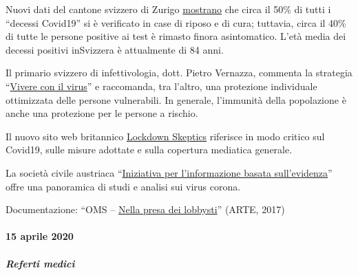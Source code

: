 Nuovi dati del cantone svizzero di Zurigo
\href{https://www.srf.ch/news/regional/zuerich-schaffhausen/corona-uebersicht-zh-und-sh-schlieren-als-zentrum-der-forschung-im-kampf-gegen-corona}{mostrano}
che circa il 50\% di tutti i ``decessi Covid19'' si è verificato in case
di riposo e di cura; tuttavia, circa il 40\% di tutte le persone
positive ai test è rimasto finora asintomatico. L'età media dei decessi
positivi in ​​Svizzera è attualmente di 84 anni.

Il primario svizzero di infettivologia, dott. Pietro Vernazza, commenta
la strategia
``\href{https://infekt.ch/2020/04/exitstrategie-lockdown/}{Vivere con il
virus}'' e raccomanda, tra l'altro, una protezione individuale
ottimizzata delle persone vulnerabili. In generale, l'immunità della
popolazione è anche una protezione per le persone a rischio.

Il nuovo sito web britannico
\href{https://lockdownsceptics.org/}{Lockdown Skeptics} riferisce in
modo critico sul Covid19, sulle misure adottate e sulla copertura
mediatica generale.

La società civile austriaca
``\href{https://www.initiative-corona.info/}{Iniziativa per
l'informazione basata sull'evidenza}'' offre una panoramica di studi e
analisi sui virus corona.

Documentazione: ``OMS --
\href{https://www.youtube.com/watch?v=dYlia_fQOLk}{Nella presa dei
lobbysti}'' (ARTE, 2017)

\hypertarget{15-aprile-2020}{%
\paragraph{15 aprile 2020}\label{15-aprile-2020}}

\hypertarget{referti-medici-1}{%
\subparagraph{\texorpdfstring{\textbf{Referti
medici}}{Referti medici}}\label{referti-medici-1}}

